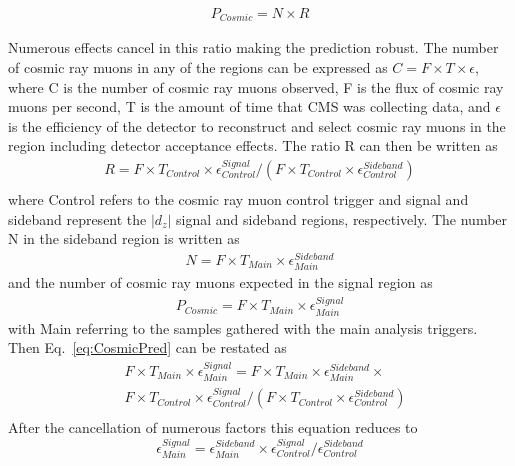 \begin{equation}
\begin{split}
P_{Cosmic} = N \times R
\end{split}
\label{eq:CosmicPred}
\end{equation}

Numerous effects cancel in this ratio making the prediction robust. The number of cosmic ray muons in any of the regions can be expressed as 
$C = F \times T \times \epsilon$, where C is the number of cosmic ray muons observed, F is the flux of cosmic ray muons per second, T is the amount of time that CMS was collecting data,
and $\epsilon$ is the efficiency of the detector to reconstruct and select cosmic ray muons in the region including detector acceptance effects. 
The ratio R can then be written as
\begin{equation}
\begin{split}
R = F \times T_{Control} \times \epsilon_{Control}^{Signal} / (F \times T_{Control} \times \epsilon_{Control}^{Sideband}) \\
\end{split}
\label{eq:CosmicRatio}
\end{equation}
where Control refers to the cosmic ray muon control trigger
and signal and sideband represent the $|d_z|$ signal and sideband regions, respectively.
The number N in the sideband region is written as 
\begin{equation}
\begin{split}
N = F \times T_{Main} \times \epsilon_{Main}^{Sideband}
\end{split}
\label{eq:CosmicSide}
\end{equation}
and the number of cosmic ray muons expected in the signal region as
\begin{equation}
\begin{split}
P_{Cosmic} = F \times T_{Main} \times \epsilon_{Main}^{Signal}
\end{split}
\label{eq:CosmicSignal}
\end{equation}
with Main referring to the samples gathered with the main analysis triggers.
Then Eq.~\ref{eq:CosmicPred} can be restated as
\begin{equation}
\begin{split}
& F \times T_{Main} \times \epsilon_{Main}^{Signal} = F \times T_{Main} \times \epsilon_{Main}^{Sideband} \times \\
& F \times T_{Control} \times \epsilon_{Control}^{Signal} / (F \times T_{Control} \times \epsilon_{Control}^{Sideband}) \\
\end{split}
\label{eq:CosmicDetail}
\end{equation}
After the cancellation of numerous factors this equation reduces to 
\begin{equation}
\epsilon_{Main}^{Signal} = \epsilon_{Main}^{Sideband} \times \epsilon_{Control}^{Signal} / \epsilon_{Control}^{Sideband}
\label{eq:ReducedCosmicPred}
\end{equation}

